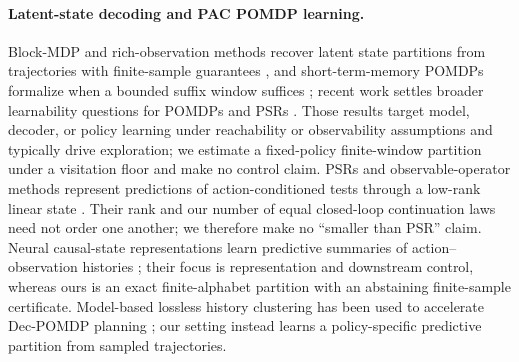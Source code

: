 \documentclass{article}
\begin{document}
\paragraph{Latent-state decoding and PAC POMDP learning.}
Block-MDP and rich-observation methods recover latent state partitions from
trajectories with finite-sample guarantees
\citep{krishnamurthy2016pac,du2019provably,misra2020kinematic}, and
short-term-memory POMDPs formalize when a bounded suffix window suffices
\citep{efroni2022provable}; recent work settles broader learnability
questions for POMDPs and PSRs \citep{liu2022partially,golowich2022learning,
jin2020sample,guo2016pac}.  Those results target model, decoder, or policy
learning under reachability or observability assumptions and typically drive
exploration; we estimate a fixed-policy finite-window partition under a
visitation floor and make no control claim.  PSRs and observable-operator
methods represent predictions of action-conditioned tests through a low-rank
linear state \citep{littman2001predictive,singh2004predictive,
jaeger2000observable,boots2010closing,hsu2012spectral}.  Their rank and our
number of equal closed-loop continuation laws need not order one another; we
therefore make no ``smaller than PSR'' claim.  Neural causal-state
representations learn predictive summaries of action--observation histories
\citep{zhang2019causal}; their focus is representation and downstream
control, whereas ours is an exact finite-alphabet partition with an
abstaining finite-sample certificate.  Model-based lossless history
clustering has been used to accelerate Dec-POMDP planning
\citep{oliehoek2009lossless}; our setting instead learns a policy-specific
predictive partition from sampled trajectories.
\end{document}
